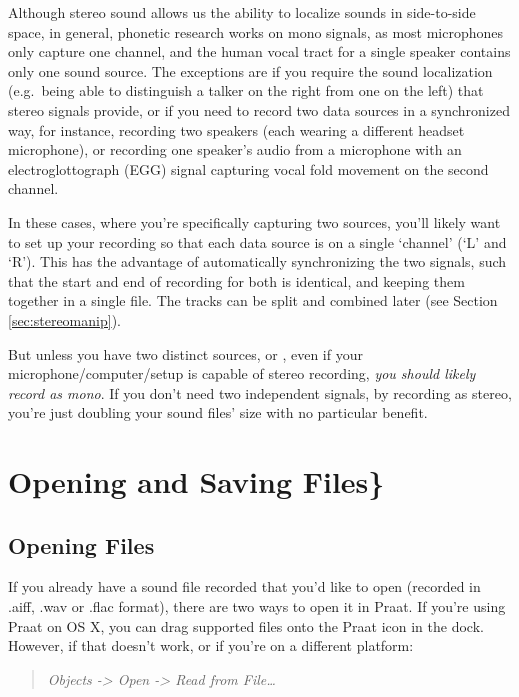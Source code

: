 \documentclass[11pt]{article}
\begin{document}
Although stereo sound allows us the ability to localize sounds in
side-to-side space, in general, phonetic research works on mono signals,
as most microphones only capture one channel, and the human vocal tract
for a single speaker contains only one sound source. The exceptions are
if you require the sound localization (e.g.~being able to distinguish a
talker on the right from one on the left) that stereo signals provide,
or if you need to record two data sources in a synchronized way, for
instance, recording two speakers (each wearing a different headset
microphone), or recording one speaker's audio from a microphone with an
electroglottograph (EGG) signal capturing vocal fold movement on the
second channel.

In these cases, where you're specifically capturing two sources, you'll
likely want to set up your recording so that each data source is on a
single `channel' (`L' and `R'). This has the advantage of automatically
synchronizing the two signals, such that the start and end of recording
for both is identical, and keeping them together in a single file. The
tracks can be split and combined later (see Section
\ref{sec:stereomanip}).

But unless you have two distinct sources, or , even if your
microphone/computer/setup is capable of stereo recording, \emph{you
should likely record as mono}. If you don't need two independent
signals, by recording as stereo, you're just doubling your sound files'
size with no particular benefit.

\hypertarget{opening-and-saving-files}{%
\section{Opening and Saving Files\}}\label{opening-and-saving-files}}

\label{opening}

\hypertarget{opening-files}{%
\subsection{Opening Files}\label{opening-files}}

If you already have a sound file recorded that you'd like to open
(recorded in .aiff, .wav or .flac format), there are two ways to open it
in Praat. If you're using Praat on OS X, you can drag supported files
onto the Praat icon in the dock. However, if that doesn't work, or if
you're on a different platform:

\begin{quote}
\emph{Objects -\textgreater{} Open -\textgreater{} Read from
File\ldots{}}
\end{quote}
\end{document}
